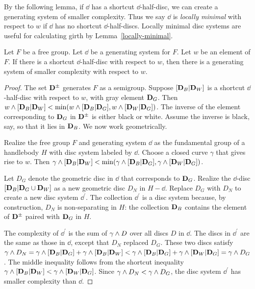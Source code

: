 By the following lemma, if $\dd$ has a shortcut $\dd$-half-disc, we can create a generating system of smaller complexity.  Thus we say $\dd$ is \emph{locally minimal} with respect to $w$ if $\dd$ has no shortcut $\dd$-half-discs.  Locally minimal disc systems are useful for calculating girth by Lemma~\ref{locally-minimal}.

\begin{lemma}
\label{curve shortcut}
Let $F$ be a free group.  Let $\dd$ be a generating system for $F$.  Let $w$ be an element of $F$.  If there is a shortcut $\dd$-half-disc with respect to $w$, then there is a generating system of smaller complexity with respect to $w$.
\end{lemma}

\begin{proof}
The set $\mathbf{D}^\pm$ generates $F$ as a semigroup.  Suppose $[\mathbf{D}_B | \mathbf{D}_W]$ is a shortcut $\dd$-half-disc with respect to $w$, with gray element $\mathbf{D}_G$.   Then $w\wedge[\mathbf{D}_B | \mathbf{D}_W]<\min(w\wedge[\mathbf{D}_B | \mathbf{D}_G],w\wedge[\mathbf{D}_W | \mathbf{D}_G])$.  The inverse of the element corresponding to $\mathbf{D}_G$ in $\mathbf{D}^\pm$ is either black or white.  Assume the inverse is black, say, so that it lies in $\mathbf{D}_B$.  We now work geometrically.

Realize the free group $F$ and generating system $\dd$ as the fundamental group of a handlebody $H$ with disc system labeled by $\dd$.  Choose a closed curve $\gamma$ that gives rise to $w$.  Then $\gamma\wedge[\mathbf{D}_B | \mathbf{D}_W]<\min(\gamma\wedge[\mathbf{D}_B | \mathbf{D}_G],\gamma\wedge[\mathbf{D}_W | \mathbf{D}_G])$.

Let $D_{G}$ denote the geometric disc in $\dd$ that corresponds to $\mathbf{D}_G$.  Realize the $\dd$-disc $[\mathbf{D}_B | \mathbf{D}_G\cup\mathbf{D}_W]$ as a new geometric disc $D_{N}$ in $H-\dd$.  Replace $D_{G}$ with $D_{N}$ to create a new disc system $\dd^\prime$.  The collection $\dd^\prime$ is a disc system because, by construction, $D_{N}$ is non-separating in $H$:  the collection $\mathbf{D}_B$ contains the element of $\mathbf{D}^\pm$ paired with $\mathbf{D}_G$ in $H$.

The complexity of $\dd^{\prime}$ is the sum of $\gamma\wedge D$ over all discs $D$ in $\dd$.  The discs in $\dd^{\prime}$ are the same as those in $\dd$, except that $D_{N}$ replaced $D_{G}$.  These two discs satisfy $\gamma\wedge D_{N}=\gamma\wedge[\mathbf{D}_B | \mathbf{D}_G]+\gamma\wedge[\mathbf{D}_B | \mathbf{D}_W]<\gamma\wedge[\mathbf{D}_B | \mathbf{D}_G]+\gamma\wedge[\mathbf{D}_W | \mathbf{D}_G]=\gamma\wedge D_{G}$.  The middle inequality follows from the shortcut inequality $\gamma\wedge[\mathbf{D}_B | \mathbf{D}_W]<\gamma\wedge[\mathbf{D}_W | \mathbf{D}_G]$.  Since $\gamma\wedge D_{N}<\gamma\wedge D_{G}$, the disc system $\dd^\prime$ has smaller complexity than $\dd$.
\end{proof}

